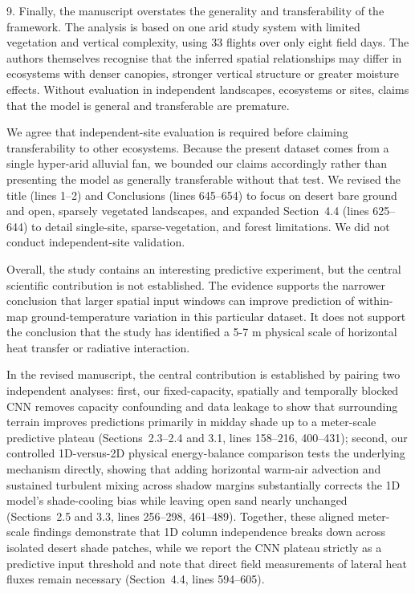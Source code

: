\documentclass[12pt,english]{reviewresponse}
\begin{document}
\begin{revcomment}
9. Finally, the manuscript overstates the generality and transferability of the framework. The analysis is based on one arid study system with limited vegetation and vertical complexity, using 33 flights over only eight field days. The authors themselves recognise that the inferred spatial relationships may differ in ecosystems with denser canopies, stronger vertical structure or greater moisture effects. Without evaluation in independent landscapes, ecosystems or sites, claims that the model is general and transferable are premature.
\end{revcomment}

\begin{revresponse}
We agree that independent-site evaluation is required before claiming transferability to other ecosystems. Because the present dataset comes from a single hyper-arid alluvial fan, we bounded our claims accordingly rather than presenting the model as generally transferable without that test. We revised the title (lines 1--2) and Conclusions (lines 645--654) to focus on desert bare ground and open, sparsely vegetated landscapes, and expanded Section~4.4 (lines 625--644) to detail single-site, sparse-vegetation, and forest limitations. We did not conduct independent-site validation.
\end{revresponse}

\begin{revcomment}
Overall, the study contains an interesting predictive experiment, but the central scientific contribution is not established. The evidence supports the narrower conclusion that larger spatial input windows can improve prediction of within-map ground-temperature variation in this particular dataset. It does not support the conclusion that the study has identified a 5-7 m physical scale of horizontal heat transfer or radiative interaction.
\end{revcomment}

\begin{revresponse}
In the revised manuscript, the central contribution is established by pairing two independent analyses: first, our fixed-capacity, spatially and temporally blocked CNN removes capacity confounding and data leakage to show that surrounding terrain improves predictions primarily in midday shade up to a meter-scale predictive plateau (Sections~2.3--2.4 and 3.1, lines 158--216, 400--431); second, our controlled 1D-versus-2D physical energy-balance comparison tests the underlying mechanism directly, showing that adding horizontal warm-air advection and sustained turbulent mixing across shadow margins substantially corrects the 1D model's shade-cooling bias while leaving open sand nearly unchanged (Sections~2.5 and 3.3, lines 256--298, 461--489). Together, these aligned meter-scale findings demonstrate that 1D column independence breaks down across isolated desert shade patches, while we report the CNN plateau strictly as a predictive input threshold and note that direct field measurements of lateral heat fluxes remain necessary (Section~4.4, lines 594--605).
\end{revresponse}
\end{document}

